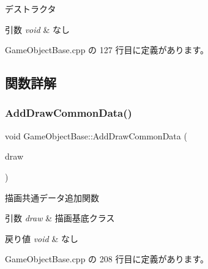 デストラクタ 


\begin{DoxyParams}{引数}
{\em void} & なし \\
\hline
\end{DoxyParams}


 Game\+Object\+Base.\+cpp の 127 行目に定義があります。



\subsection{関数詳解}
\mbox{\label{class_game_object_base_a105d9f213369929ecf934711a20e91d5}} 
\subsubsection{\texorpdfstring{Add\+Draw\+Common\+Data()}{AddDrawCommonData()}}
{\footnotesize\ttfamily void Game\+Object\+Base\+::\+Add\+Draw\+Common\+Data (\begin{DoxyParamCaption}\item[{\mbox{\hyperlink{class_draw_base}{Draw\+Base}} $\ast$}]{draw }\end{DoxyParamCaption})\hspace{0.3cm}{\ttfamily [private]}}



描画共通データ追加関数 


\begin{DoxyParams}{引数}
{\em draw} & 描画基底クラス \\
\hline
\end{DoxyParams}

\begin{DoxyRetVals}{戻り値}
{\em void} & なし \\
\hline
\end{DoxyRetVals}


 Game\+Object\+Base.\+cpp の 208 行目に定義があります。

\mbox{\label{class_game_object_base_adf7df49baa04363c63f9515317776e40}} 
